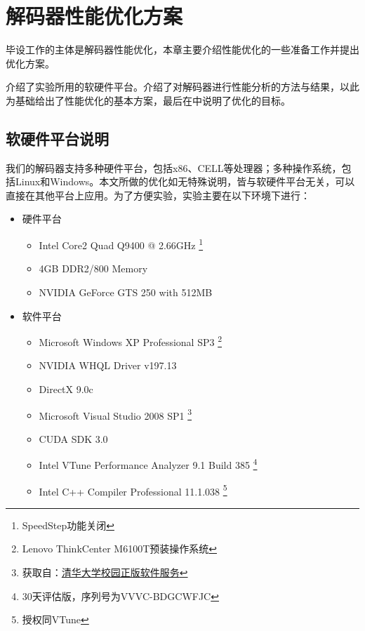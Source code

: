 

\chapter{解码器性能优化方案}
\label{cha:optapproach}

毕设工作的主体是解码器性能优化，本章主要介绍性能优化的一些准备工作并提出优化方案。

介绍了实验所用的软硬件平台。介绍了对解码器进行性能分析的方法与结果，以此为基础给出了性能优化的基本方案，最后在中说明了优化的目标。

\section{软硬件平台说明}
\label{sec:platformdesc}

我们的解码器支持多种硬件平台，包括x86、CELL等处理器；多种操作系统，包括Linux和Windows。本文所做的优化如无特殊说明，皆与软硬件平台无关，可以直接在其他平台上应用。为了方便实验，实验主要在以下环境下进行：

\begin{itemize}
\item {硬件平台}

\begin{itemize}
\item Intel Core2 Quad Q9400 @ 2.66GHz
	\footnote{SpeedStep功能关闭}
\item 4GB DDR2/800 Memory
\item NVIDIA GeForce GTS 250 with 512MB
\end{itemize}

\item {软件平台}

\begin{itemize}
\item Microsoft Windows XP Professional SP3
	\footnote{Lenovo ThinkCenter M6100T预装操作系统}
\item NVIDIA WHQL Driver v197.13
\item DirectX 9.0c
\item Microsoft Visual Studio 2008 SP1
	\footnote{获取自：\href{http://helpdesk.tsinghua.edu.cn/yhfw/yhfw_zbrj_tz.jsp}{清华大学校园正版软件服务}}
\item CUDA SDK 3.0
\item Intel VTune Performance Analyzer 9.1 Build 385
	\footnote{30天评估版，序列号为VVVC-BDGCWFJC}
\item Intel C++ Compiler Professional 11.1.038
	\footnote{授权同VTune}
\end{itemize}

\end{itemize}


